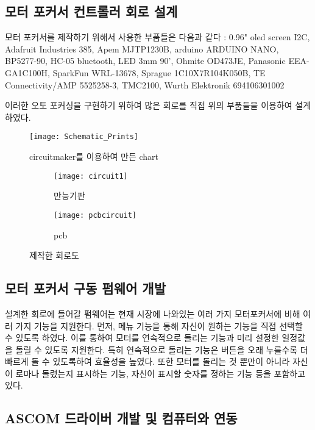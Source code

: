 \documentclass{abstract_hutech}
\begin{document}
\subsection{모터 포커서 컨트롤러 회로 설계}

모터 포커서를 제작하기 위해서 사용한 부품들은 다음과 같다 : 0.96" oled screen I2C, Adafruit Industries 385, Apem MJTP1230B, arduino ARDUINO NANO, BP5277-90, HC-05 bluetooth, LED 3mm 90', Ohmite OD473JE, Panasonic EEA-GA1C100H, SparkFun WRL-13678, Sprague 1C10X7R104K050B, TE Connectivity/AMP 5525258-3, TMC2100, Wurth Elektronik 694106301002

이러한 오토 포커싱을 구현하기 위하여 많은 회로를 직접 위의 부품들을 이용하여 설계하였다.

\begin{figure}[h]
	\centering
	\texttt{[image: Schematic\_Prints]}
	\caption{circuitmaker를 이용하여 만든 chart}
	\label{fig:Schematic_Prints}
\end{figure}

\begin{figure}[h]
\begin{subfigure}{0.43\linewidth}
\centering
\texttt{[image: circuit1]}
\caption{만능기판}
\label{fig:circuit1}
\end{subfigure}
\begin{subfigure}{0.26\textwidth}
\centering
\texttt{[image: pcbcircuit]}
\caption{pcb}
\label{fig:pcbcircuit}
\end{subfigure}
\caption{제작한 회로도}
\label{fig:ciruit}
\end{figure}

\subsection{모터 포커서 구동 펌웨어 개발}

설계한 회로에 들어갈 펌웨어는 현재 시장에 나와있는 여러 가지 모터포커서에 비해 여러 가지 기능을 지원한다. 먼저, 메뉴 기능을 통해 자신이 원하는 기능을 직접 선택할 수 있도록 하였다. 이를 통하여 모터를 연속적으로 돌리는 기능과 미리 설정한 일정값을 돌릴 수 있도록 지원한다. 특히 연속적으로 돌리는 기능은 버튼을 오래 누를수록 더 빠르게 돌 수 있도록하여 효율성을 높였다. 또한 모터를 돌리는 것 뿐만이 아니라 자신이 로마나 돌렸는지 표시하는 기능, 자신이 표시할 숫자를 정하는 기능 등을 포함하고 있다.

\subsection{ASCOM 드라이버 개발 및 컴퓨터와 연동}
\end{document}
